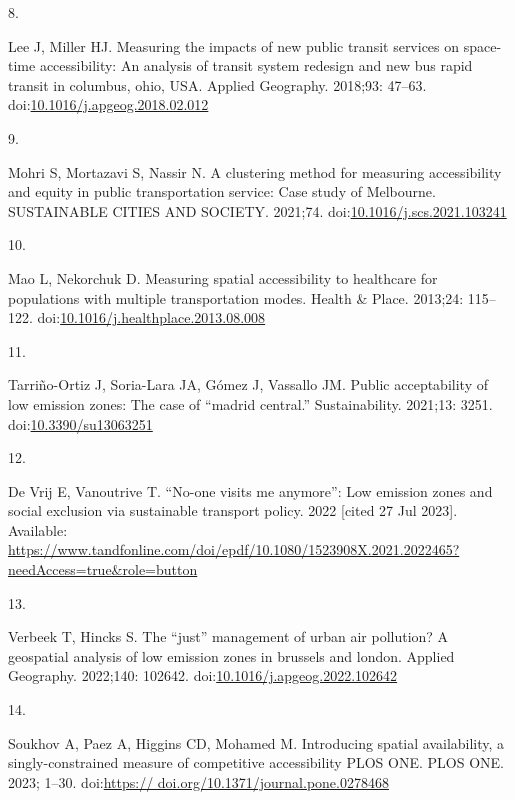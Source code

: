 \documentclass[10pt,letterpaper]{article}
\newlength{\cslhangindent}
\newlength{\csllabelwidth}
\newlength{\cslentryspacingunit} %
\newenvironment{CSLReferences}[2] %
 {%
  \setlength{\parindent}{0pt}
  \ifodd #1
  \let\oldpar\par
  \def\par{\hangindent=\cslhangindent\oldpar}
  \fi
  \setlength{\parskip}{#2\cslentryspacingunit}
 }%
 {}
\newcommand{\CSLLeftMargin}[1]{\parbox[t]{\csllabelwidth}{#1}}
\newcommand{\CSLRightInline}[1]{\parbox[t]{\linewidth - \csllabelwidth}{#1}\break}
\begin{document}
\begin{CSLReferences}{0}{0}
\leavevmode{}%
\CSLLeftMargin{8. }%
\CSLRightInline{Lee J, Miller HJ. Measuring the impacts of new public
transit services on space-time accessibility: An analysis of transit
system redesign and new bus rapid transit in columbus, ohio, {USA}.
Applied Geography. 2018;93: 47--63.
doi:\href{https://doi.org/10.1016/j.apgeog.2018.02.012}{10.1016/j.apgeog.2018.02.012}}

\leavevmode{}%
\CSLLeftMargin{9. }%
\CSLRightInline{Mohri S, Mortazavi S, Nassir N. A clustering method for
measuring accessibility and equity in public transportation service:
{Case} study of {Melbourne}. SUSTAINABLE CITIES AND SOCIETY. 2021;74.
doi:\href{https://doi.org/10.1016/j.scs.2021.103241}{10.1016/j.scs.2021.103241}}

\leavevmode{}%
\CSLLeftMargin{10. }%
\CSLRightInline{Mao L, Nekorchuk D. Measuring spatial accessibility to
healthcare for populations with multiple transportation modes. Health \&
Place. 2013;24: 115--122.
doi:\href{https://doi.org/10.1016/j.healthplace.2013.08.008}{10.1016/j.healthplace.2013.08.008}}

\leavevmode{}%
\CSLLeftMargin{11. }%
\CSLRightInline{Tarriño-Ortiz J, Soria-Lara JA, Gómez J, Vassallo JM.
Public acceptability of low emission zones: The case of {``madrid
central.''} Sustainability. 2021;13: 3251.
doi:\href{https://doi.org/10.3390/su13063251}{10.3390/su13063251}}

\leavevmode{}%
\CSLLeftMargin{12. }%
\CSLRightInline{De Vrij E, Vanoutrive T. {``No-one visits me anymore''}:
Low emission zones and social exclusion via sustainable transport
policy. 2022 {[}cited 27 Jul 2023{]}. Available:
\url{https://www.tandfonline.com/doi/epdf/10.1080/1523908X.2021.2022465?needAccess=true\&role=button}}

\leavevmode{}%
\CSLLeftMargin{13. }%
\CSLRightInline{Verbeek T, Hincks S. The {``just''} management of urban
air pollution? A geospatial analysis of low emission zones in brussels
and london. Applied Geography. 2022;140: 102642.
doi:\href{https://doi.org/10.1016/j.apgeog.2022.102642}{10.1016/j.apgeog.2022.102642}}

\leavevmode{}%
\CSLLeftMargin{14. }%
\CSLRightInline{Soukhov A, Paez A, Higgins CD, Mohamed M. Introducing
spatial availability, a singly-constrained measure of competitive
accessibility {\textbar} {PLOS} {ONE}. {PLOS} {ONE}. 2023; 1--30.
doi:\href{https://\%20doi.org/10.1371/journal.pone.0278468}{https://
doi.org/10.1371/journal.pone.0278468}}


\end{CSLReferences}
\end{document}
